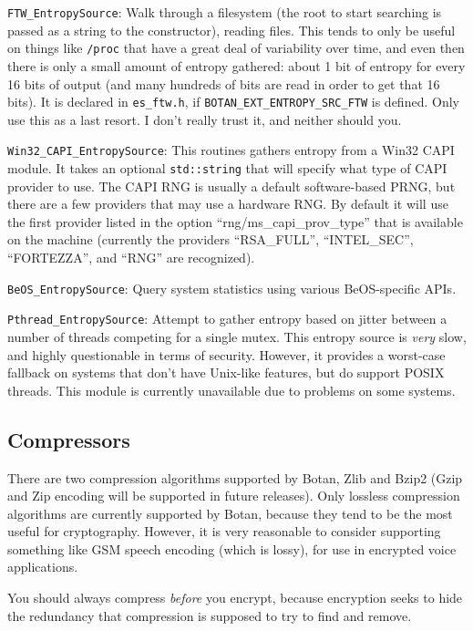 \documentclass{article}
\newcommand{\filename}[1]{\texttt{#1}}
\newcommand{\macro}[1]{\texttt{#1}}
\newcommand{\type}[1]{\texttt{#1}}
\begin{document}
\noindent
\type{FTW\_EntropySource}: Walk through a filesystem (the root to start
searching is passed as a string to the constructor), reading files. This tends
to only be useful on things like \filename{/proc} that have a great deal of
variability over time, and even then there is only a small amount of entropy
gathered: about 1 bit of entropy for every 16 bits of output (and many hundreds
of bits are read in order to get that 16 bits). It is declared in
\filename{es\_ftw.h}, if \macro{BOTAN\_EXT\_ENTROPY\_SRC\_FTW} is defined. Only
use this as a last resort. I don't really trust it, and neither should you.

\noindent
\type{Win32\_CAPI\_EntropySource}: This routines gathers entropy from
a Win32 CAPI module. It takes an optional \type{std::string} that will
specify what type of CAPI provider to use. The CAPI RNG is usually a
default software-based PRNG, but there are a few providers that may
use a hardware RNG. By default it will use the first provider listed
in the option ``rng/ms\_capi\_prov\_type'' that is available on the
machine (currently the providers ``RSA\_FULL'', ``INTEL\_SEC'',
``FORTEZZA'', and ``RNG'' are recognized).

\noindent
\type{BeOS\_EntropySource}: Query system statistics using various BeOS-specific
APIs.

\noindent
\type{Pthread\_EntropySource}: Attempt to gather entropy based on jitter
between a number of threads competing for a single mutex. This entropy source
is \emph{very} slow, and highly questionable in terms of security. However, it
provides a worst-case fallback on systems that don't have Unix-like features,
but do support POSIX threads. This module is currently unavailable due to
problems on some systems.

\subsection{Compressors}

There are two compression algorithms supported by Botan, Zlib and Bzip2 (Gzip
and Zip encoding will be supported in future releases). Only lossless
compression algorithms are currently supported by Botan, because they tend to
be the most useful for cryptography. However, it is very reasonable to consider
supporting something like GSM speech encoding (which is lossy), for use in
encrypted voice applications.

You should always compress \emph{before} you encrypt, because encryption seeks
to hide the redundancy that compression is supposed to try to find and remove.
\end{document}
